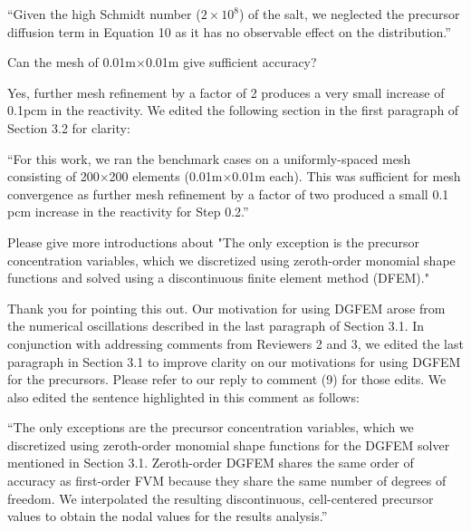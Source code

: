 \documentclass[answers,11pt]{exam}
\begin{document}
\begin{questions}
\begin{solution}
        	``Given the high Schmidt number ($2\times10^8$)
\cite{tiberga_results_2020} of the salt, we neglected the precursor diffusion
term in Equation 10 as it has no observable effect on the distribution.''
        \end{solution}

        \question Can the mesh of 0.01m$\times$0.01m give sufficient accuracy?
        \begin{solution}
        	Yes, further mesh refinement by a factor of 2 produces a very small
        	increase of 0.1pcm in the reactivity. We edited the following
        	section in the first paragraph of Section 3.2 for clarity:
        	
        	``For this work, we ran the benchmark cases on a uniformly-spaced
        	mesh consisting of 200$\times$200 elements (0.01m$\times$0.01m
        	each). This was sufficient for mesh convergence as further mesh
        	refinement by a factor of two produced a small 0.1 pcm increase in
        	the reactivity for Step 0.2.''
        \end{solution}

        \question Please give more introductions about "The only exception is
        the precursor concentration variables, which we discretized using
        zeroth-order monomial shape functions and solved using a discontinuous
        finite element method (DFEM)."
        \begin{solution}
        	Thank you for pointing this out. Our motivation for using DGFEM
        	arose from the numerical oscillations described in the last
        	paragraph of Section 3.1. In conjunction with addressing comments
        	from Reviewers 2 and 3, we edited the last paragraph in Section 3.1
        	to improve clarity on our motivations for using DGFEM for the
        	precursors. Please refer to our reply to comment (9) for those
        	edits. We also edited the sentence highlighted in this comment
        	as follows:
        	
        	``The only exceptions are the precursor concentration variables, which we discretized using zeroth-order monomial shape functions for the DGFEM solver mentioned in Section 3.1. Zeroth-order DGFEM shares the same order of accuracy as first-order FVM because they share the same number of degrees of freedom. We interpolated the resulting discontinuous, cell-centered precursor values to obtain the nodal values for the results analysis.''
        \end{solution}


\end{questions}
\end{document}

